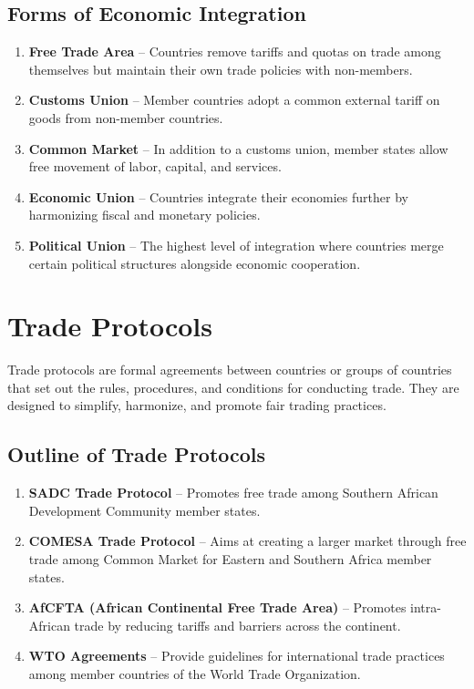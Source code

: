 \documentclass[12pt,a4paper, openany]{book}
\begin{document}
\subsection{Forms of Economic Integration}
\begin{enumerate}
	\item \textbf{Free Trade Area} – Countries remove tariffs and quotas on trade among themselves but maintain their own trade policies with non-members.
	\item \textbf{Customs Union} – Member countries adopt a common external tariff on goods from non-member countries.
	\item \textbf{Common Market} – In addition to a customs union, member states allow free movement of labor, capital, and services.
	\item \textbf{Economic Union} – Countries integrate their economies further by harmonizing fiscal and monetary policies.
	\item \textbf{Political Union} – The highest level of integration where countries merge certain political structures alongside economic cooperation.
\end{enumerate}

\section{Trade Protocols}
Trade protocols are formal agreements between countries or groups of countries
that set out the rules, procedures, and conditions for conducting trade.
They are designed to simplify, harmonize, and promote fair trading practices.

\subsection{Outline of Trade Protocols}
\begin{enumerate}
	\item \textbf{SADC Trade Protocol} – Promotes free trade among Southern African Development Community member states.
	\item \textbf{COMESA Trade Protocol} – Aims at creating a larger market through free trade among Common Market for Eastern and Southern Africa member states.
	\item \textbf{AfCFTA (African Continental Free Trade Area)} – Promotes intra-African trade by reducing tariffs and barriers across the continent.
	\item \textbf{WTO Agreements} – Provide guidelines for international trade practices among member countries of the World Trade Organization.
\end{enumerate}
\end{document}
